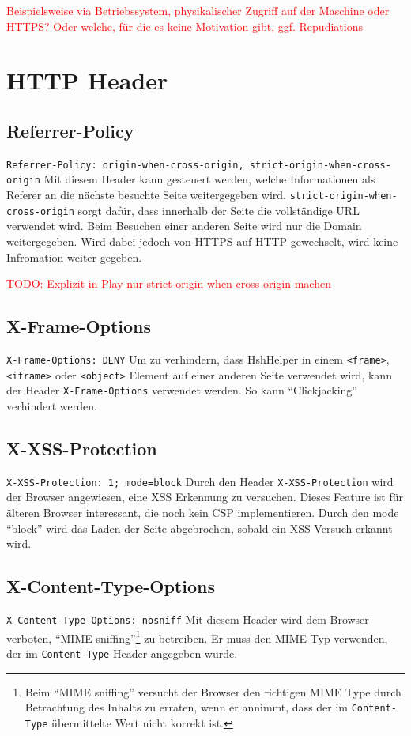 \documentclass[12pt,DIV14,BCOR10mm,a4paper,parskip=half-,headsepline,headinclude,english,ngerman,bibliography=totocnumbered]{scrreprt}
\begin{document}
\textcolor{red}{
Beispielsweise via Betriebssystem, physikalischer Zugriff auf der Maschine oder HTTPS?
Oder welche, für die es keine Motivation gibt, ggf. Repudiations
}

\section{HTTP Header}

\subsection{Referrer-Policy}
\texttt{Referrer-Policy: origin-when-cross-origin, strict-origin-when-cross-origin}\newline
Mit diesem Header kann gesteuert werden, welche Informationen als Referer an die nächste besuchte Seite weitergegeben wird. \texttt{strict-origin-when-cross-origin} sorgt dafür, dass innerhalb der Seite die vollständige URL verwendet wird. Beim Besuchen einer anderen Seite wird nur die Domain weitergegeben. Wird dabei jedoch von HTTPS auf HTTP gewechselt, wird keine Infromation weiter gegeben.

\textcolor{red}{
TODO: Explizit in Play nur strict-origin-when-cross-origin machen
}
\subsection{X-Frame-Options}
\texttt{X-Frame-Options: DENY}\newline
Um zu verhindern, dass HshHelper in einem \texttt{<frame>}, \texttt{<iframe>} oder \texttt{<object>} Element auf einer anderen Seite verwendet wird, kann der Header \texttt{X-Frame-Options} verwendet werden. So kann \enquote{Clickjacking} verhindert werden.

\subsection{X-XSS-Protection}
\texttt{X-XSS-Protection: 1; mode=block}\newline
Durch den Header \texttt{X-XSS-Protection} wird der Browser angewiesen, eine XSS Erkennung zu versuchen. Dieses Feature ist für älteren Browser interessant, die noch kein CSP implementieren. Durch den mode \enquote{block} wird das Laden der Seite abgebrochen, sobald ein XSS Versuch erkannt wird.

\subsection{X-Content-Type-Options}
\texttt{X-Content-Type-Options: nosniff}\newline
Mit diesem Header wird dem Browser verboten, \enquote{MIME sniffing}\footnote{Beim \enquote{MIME sniffing} versucht der Browser den richtigen MIME Type durch Betrachtung des Inhalts zu erraten, wenn er annimmt, dass der im \texttt{Content-Type} übermittelte Wert nicht korrekt ist.} zu betreiben. Er muss den MIME Typ verwenden, der im \texttt{Content-Type} Header angegeben wurde.
\end{document}
